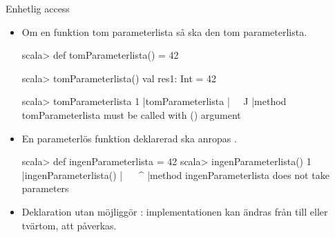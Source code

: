 \begin{Slide}{Enhetlig access}\SlideFontSmall
\begin{itemize}
\item Om en funktion   tom parameterlista \code{()} så ska den   tom parameterlista.
\begin{REPLsmall}
scala> def tomParameterlista() = 42

scala> tomParameterlista()
val res1: Int = 42

scala> tomParameterlista                                                                                                                    
1 |tomParameterlista
  |^^^^^^^^^^^^^^^^^
  |method tomParameterlista must be called with () argument
\end{REPLsmall}

\item En parameterlös funktion deklarerad  \code{()} ska anropas  \code{()}. 
\begin{REPLsmall}
scala> def ingenParameterlista = 42
scala> ingenParameterlista()
1 |ingenParameterlista()
  |^^^^^^^^^^^^^^^^^^^
  |method ingenParameterlista does not take parameters
\end{REPLsmall}

\pause
\item Deklaration utan \code{()} möjliggör : implementationen kan ändras från  till  eller tvärtom,  att  påverkas.

\end{itemize}
\end{Slide}



